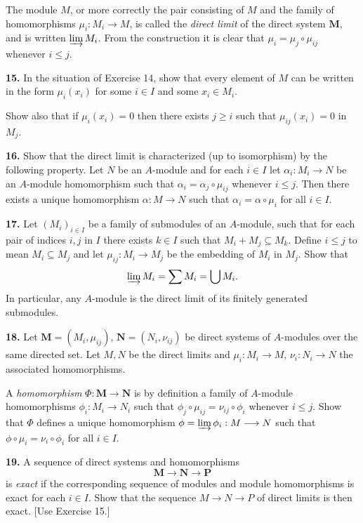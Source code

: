 The module $M$, or more correctly the pair consisting of $M$ and the family of
homomorphisms $\mu_i:M_i\longrightarrow M$, is called the \emph{direct limit} of the direct system $\mathbf M$,
and is written $\varinjlim M_i$.  From the construction it is clear that $\mu_i=\mu_j\circ\mu_{ij}$
whenever $i\leq j$.

\medskip
\noindent\amstar\textbf{15.} In the situation of Exercise 14, show that every element of $M$ can be written in
the form $\mu_i(x_i)$ for some $i\in I$ and some $x_i\in M_i$.

Show also that if $\mu_i(x_i)=0$ then there exists $j\geq i$ such that $\mu_{ij}(x_i)=0$
in $M_j$.

\medskip
\noindent\amstar\textbf{16.} Show that the direct limit is characterized (up to isomorphism) by the following
property.  Let $N$ be an $A$-module and for each $i\in I$ let $\alpha_i:M_i\longrightarrow N$ be an $A$-module homomorphism such that $\alpha_i=\alpha_j\circ\mu_{ij}$ whenever $i\leq j$.  Then there exists
a unique homomorphism $\alpha:M\longrightarrow N$ such that $\alpha_i=\alpha\circ\mu_i$ for all $i\in I$.

\medskip
\noindent\amstar\textbf{17.} Let $(M_i)_{i\in I}$ be a family of submodules of an $A$-module, such that for each pair of
indices $i,j$ in $I$ there exists $k\in I$ such that $M_i+M_j\subseteq M_k$.  Define $i\leq j$ to
mean $M_i\subseteq M_j$ and let $\mu_{ij}:M_i\longrightarrow M_j$ be the embedding of $M_i$ in $M_j$.  Show that
\[
\varinjlim M_i=\sum M_i=\bigcup M_i.
\]
In particular, any $A$-module is the direct limit of its finitely generated submodules.

\medskip
\noindent\amstar\textbf{18.} Let $\mathbf M=(M_i,\mu_{ij})$, $\mathbf N=(N_i,\nu_{ij})$ be direct systems of $A$-modules over the same
directed set.  Let $M,N$ be the direct limits and $\mu_i:M_i\longrightarrow M$, $\nu_i:N_i\longrightarrow N$ the
associated homomorphisms.

A \emph{homomorphism} $\Phi:\mathbf M\longrightarrow\mathbf N$ is by definition a family of $A$-module homomorphisms $\phi_i:M_i\longrightarrow N_i$ such that $\phi_j\circ\mu_{ij}=\nu_{ij}\circ\phi_i$ whenever $i\leq j$.  Show that
$\Phi$ defines a unique homomorphism $\phi=\varinjlim\phi_i:M\longrightarrow N$ such that $\phi\circ\mu_i=
\nu_i\circ\phi_i$ for all $i\in I$.

\medskip
\noindent\amstar\textbf{19.} A sequence of direct systems and homomorphisms
\[
\mathbf M\longrightarrow\mathbf N\longrightarrow\mathbf P
\]
is \emph{exact} if the corresponding sequence of modules and module homomorphisms
is exact for each $i\in I$.  Show that the sequence $M\longrightarrow N\longrightarrow P$ of direct limits is
then exact.  [Use Exercise 15.]

